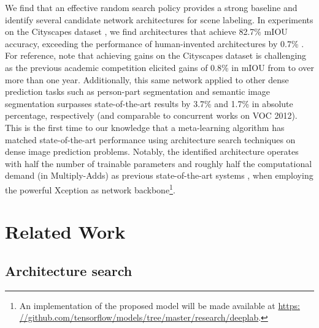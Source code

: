 \documentclass{article}
\begin{document}
We find that an effective random search policy provides a strong baseline \cite{bergstra2012random, golovin2017google} and identify several candidate network architectures for scene labeling. In experiments on the Cityscapes dataset \cite{Cordts2016Cityscapes}, we find architectures that achieve 82.7\% mIOU accuracy, exceeding the performance of human-invented architectures by 0.7\% \cite{bulo2017place}. For reference, note that achieving gains on the Cityscapes dataset is challenging as the previous academic competition elicited gains of 0.8\% in mIOU from \cite{zhao2017pyramid} to \cite{bulo2017place} over more than one year. Additionally, this same network applied to other dense prediction tasks such as person-part segmentation \cite{chen_cvpr14} and semantic image segmentation \cite{everingham2014pascal} surpasses state-of-the-art results \cite{fang2018weakly, yu2018learning} by 3.7\% and 1.7\% in absolute percentage, respectively (and comparable to concurrent works \cite{deeplabv3plus2018, zhang2018exfuse, lin2018msci} on VOC 2012). This is the first time to our knowledge that a meta-learning algorithm has matched state-of-the-art performance using architecture search techniques on dense image prediction problems. Notably, the identified architecture operates with half the number of trainable parameters and roughly half the computational demand (in Multiply-Adds) as previous state-of-the-art systems \cite{deeplabv3plus2018}, when employing the powerful Xception \cite{chollet2016xception, dai2017coco, deeplabv3plus2018} as network backbone\footnote{An implementation of the proposed model will be made available at \url{https:
//github.com/tensorflow/models/tree/master/research/deeplab}.}.



 \section{Related Work}
\label{sec:related_work}
\subsection{Architecture search}
\end{document}
